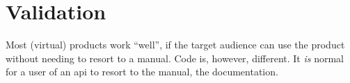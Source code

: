 
\begingroup
\let\clearpage\relax
\let\cleardoublepage\relax
\let\cleardoublepage\relax

\manualmark
{}

\chapter*{Validation}\label{addendum-validation}

Most (virtual) products work ``well'', if the target audience can use the
  product without needing to resort to a manual.
Code is, however, different.
It \emph{is} normal for a user of an \gls{api} to resort to the manual,
  the documentation.

\endgroup
